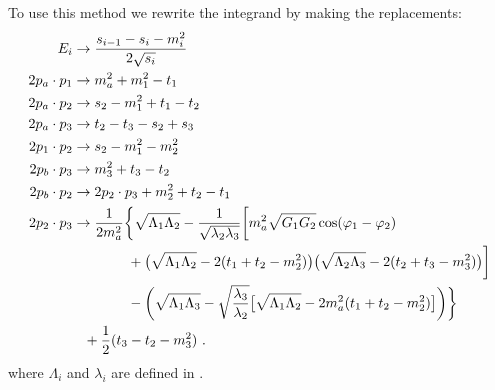 To use this method we rewrite the integrand by making the replacements:
\begin{align}
    E_i &\rightarrow \frac{s_{i-1} - s_i - m_i^2}{2\sqrt{s_i}} \label{eq:energy-replacement-formula} \\ 
    2 p_a \cdot p_1 &\rightarrow m_a^2 +  m_1^2 - t_1 \\
    2 p_a \cdot p_2 &\rightarrow s_2 - m_1^2 + t_1 - t_2 \\
    2 p_a \cdot p_3 &\rightarrow t_2 - t_3 - s_2 + s_3 \\
    2 p_1 \cdot p_2 &\rightarrow s_2 - m_1^2 - m_2^2 \\
    2p_b \cdot p_3 &\rightarrow m_3^2 + t_3 - t_2 \\
    2p_b \cdot p_2 &\rightarrow 2 p_2 \cdot p_3 + m_2^2 + t_2 - t_1 \\
    2 p_2 \cdot p_3 &\rightarrow  \label{eq:p2-dot-p3-replacement-rule}
        \frac{1}{2 m_a^2} 
        \bigg\{
        \sqrt{\Lambda_1 \Lambda_2}
                - 
                \frac{1}{\sqrt{\lambda_2 \lambda_3}}
                \bigg[
                    m_a^2 \sqrt{G_1 G_2} \cos (\varphi_1 - \varphi_2) \\
                    &\hphantom{=\frac{1}{4 m_a^2}\bigg\{} + 
                    \big(\sqrt{\Lambda_1 \Lambda_2} - 2 (t_1 + t_2 - m_2^2)\big)
                    \big(\sqrt{\Lambda_2 \Lambda_3} - 2 (t_2 + t_3 - m_3^2)\big)
                \bigg] \\
        &\hphantom{=\frac{1}{4 m_a^2}\bigg\{} -
        \bigg(
        \sqrt{\Lambda_1 \Lambda_3} - \sqrt{\frac{\lambda_3}{\lambda_2}} 
                \big[
                    \sqrt{\Lambda_1 \Lambda_2} - 2 m_a^2(t_1 + t_2 - m_2^2)
                \big]
        \bigg)
        \bigg\} \\
        &\hphantom{=}+
        \frac{1}{2}(t_3 - t_2 - m_3^2) \ .
\end{align}
where $\Lambda_i$ and $\lambda_i$ are defined in .


